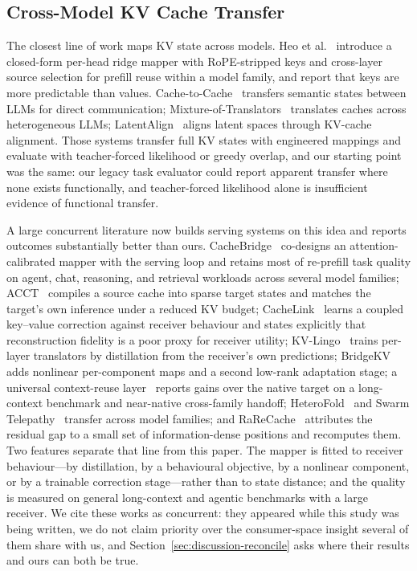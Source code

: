 \documentclass[11pt]{article}
\begin{document}
\subsection{Cross-Model KV Cache Transfer}
\label{sec:rw-transfer}
The closest line of work maps KV state across models.
Heo et al.~\cite{heo2026crossmodel} introduce a closed-form per-head ridge mapper
with RoPE-stripped keys and cross-layer source selection for prefill reuse within
a model family, and report that keys are more predictable than values.
Cache-to-Cache~\cite{fu2026c2c} transfers semantic states between LLMs for direct
communication; Mixture-of-Translators~\cite{lee2026translators} translates caches
across heterogeneous LLMs; LatentAlign~\cite{dery2026latentalign} aligns latent
spaces through KV-cache alignment. Those systems transfer full KV states with
engineered mappings and evaluate with teacher-forced likelihood or greedy overlap,
and our starting point was the same: our legacy task
evaluator could report apparent transfer where none exists functionally, and
teacher-forced likelihood alone is insufficient evidence of functional transfer.

A large concurrent literature now builds serving systems on this idea and reports
outcomes substantially better than ours.
CacheBridge~\cite{cachebridge2026} co-designs an attention-calibrated mapper with
the serving loop and retains most of re-prefill task quality on agent, chat,
reasoning, and retrieval workloads across several model families;
ACCT~\cite{acct2026} compiles a source cache into sparse target states and matches
the target's own inference under a reduced KV budget;
CacheLink~\cite{cachelink2026} learns a coupled key--value correction against
receiver behaviour and states explicitly that reconstruction fidelity is a poor
proxy for receiver utility;
KV-Lingo~\cite{kvlingo2026} trains per-layer translators by distillation from the
receiver's own predictions;
BridgeKV~\cite{bridgekv2026} adds nonlinear per-component maps and a second
low-rank adaptation stage;
a universal context-reuse layer~\cite{contextreuse2026} reports gains over the
native target on a long-context benchmark and near-native cross-family handoff;
HeteroFold~\cite{heterofold2026} and Swarm Telepathy~\cite{swarmtelepathy2026}
transfer across model families;
and RaReCache~\cite{rarecache2026} attributes the residual gap to a small set of
information-dense positions and recomputes them.
Two features separate that line from this paper.
The mapper is fitted to receiver behaviour---by distillation, by a behavioural
objective, by a nonlinear component, or by a trainable correction
stage---rather than to state distance; and the quality is measured on general
long-context and agentic benchmarks with a large receiver.
We cite these works as concurrent: they appeared while this study was being
written, we do not claim priority over the consumer-space insight several of them
share with us, and Section~\ref{sec:discussion-reconcile} asks where their results
and ours can both be true.
\end{document}
